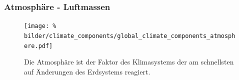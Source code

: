 \begin{frame}
	\frametitle{Atmosphäre - Luftmassen}

	\begin{figure}
		\centering
		\texttt{[image: \%
        bilder/climate\_components/global\_climate\_components\_atmosphere.pdf]}
		\caption{Die Atmosphäre ist der Faktor des Klimasystems der am schnellsten auf Änderungen des Erdsystems reagiert.}
	\end{figure}

\end{frame}

